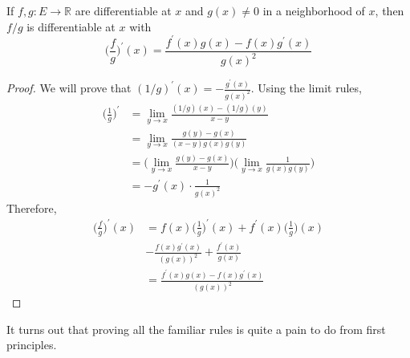 	\begin{lemma}
		\label{thm:quotient_rule}
		If $f, g: E \to \mathbb{R}$ are differentiable at $x$ and $g(x) \neq 0$ in a neighborhood of $x$, then $f/g$ is differentiable at $x$ with 
		\begin{equation}
			\bigg(\frac{f}{g} \bigg)^\prime (x) = \frac{f^\prime(x) g(x) - f(x) g^\prime (x)}{g(x)^2}
		\end{equation}
	\end{lemma}
	\begin{proof}
		We will prove that $(1/g)^\prime (x) = - \frac{g^\prime (x)}{g(x)^2}$. Using the limit rules, 
		\begin{align}
			\bigg(\frac{1}{g} \bigg)^\prime & = \lim_{y \to x} \frac{(1/g)(x) - (1/g)(y)}{x - y} \\
																			& = \lim_{y \to x} \frac{g(y) - g(x)} {(x - y) g(x) g(y)}  \\ 
																			& = \bigg( \lim_{y \to x} \frac{g(y) - g(x)}{x - y} \bigg) \bigg( \lim_{y \to x} \frac{1}{g(x) g(y)}\bigg) \\ 
																			& = -g^\prime (x) \cdot \frac{1}{g(x)^2}
		\end{align} 
		Therefore, 
		\begin{align}
			\bigg(\frac{f}{g} \bigg)^\prime (x) & = f(x) \bigg(\frac{1}{g})^\prime (x) + f^\prime (x) \bigg(\frac{1}{g}\bigg)(x) \\ 
																					& -\frac{f(x) g^\prime (x)}{(g(x))^2} + \frac{f^\prime (x)}{g(x)} \\ 
																					& = \frac{f^\prime (x) g(x) - f(x) g^\prime (x)}{(g(x))^2}
		\end{align}
	\end{proof}

  It turns out that proving all the familiar rules is quite a pain to do from first principles. 

